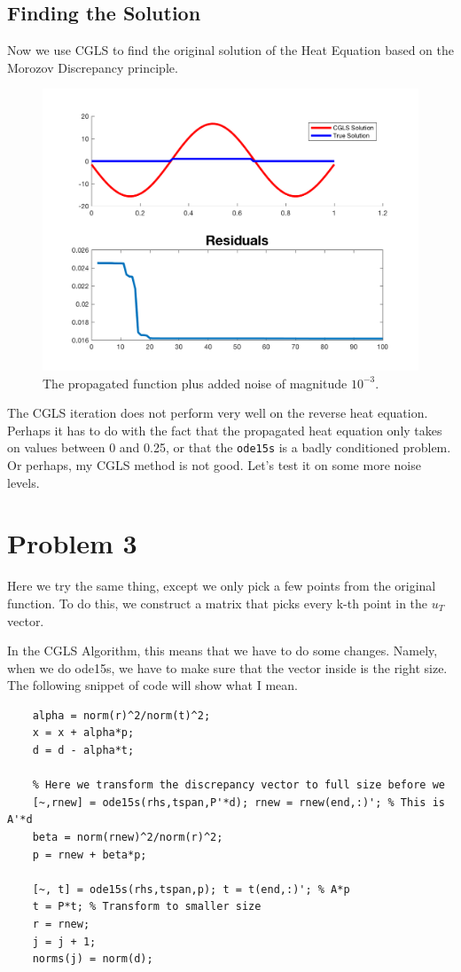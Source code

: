 \documentclass{article}
\begin{document}
\subsection{Finding the Solution}

Now we use CGLS to find the original solution of the Heat Equation based on the Morozov Discrepancy principle.

\begin{figure}[H]
    \centerline{
    \includegraphics[height = 6 cm]{problem2final.png}
    }
    \caption{\label{fig:problem2final} The propagated function plus added noise of magnitude $10^{-3}$.}
\end{figure}

The CGLS iteration does not perform very well on the reverse heat equation. Perhaps it has to do with the fact that the propagated heat equation only takes on values between 0 and 0.25, or that the \texttt{ode15s} is a badly conditioned problem. Or perhaps, my CGLS method is not good. Let's test it on some more noise levels.

\section{Problem 3}

Here we try the same thing, except we only pick a few points from the original function. To do this, we construct a matrix that picks every k-th point in the $u_{T}$ vector.

In the CGLS Algorithm, this means that we have to do some changes. Namely, when we do ode15s, we have to make sure that the vector inside is the right size. The following snippet of code will show what I mean.

\begin{verbatim}
    alpha = norm(r)^2/norm(t)^2;
    x = x + alpha*p;
    d = d - alpha*t;

    % Here we transform the discrepancy vector to full size before we
    [~,rnew] = ode15s(rhs,tspan,P'*d); rnew = rnew(end,:)'; % This is A'*d
    beta = norm(rnew)^2/norm(r)^2;
    p = rnew + beta*p;

    [~, t] = ode15s(rhs,tspan,p); t = t(end,:)'; % A*p
    t = P*t; % Transform to smaller size
    r = rnew;
    j = j + 1;
    norms(j) = norm(d);
\end{verbatim}
\end{document}

